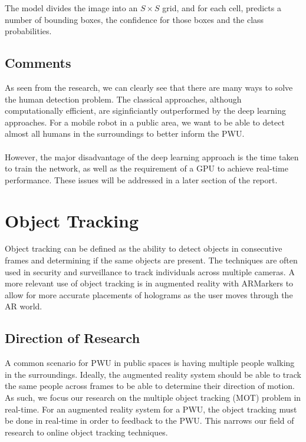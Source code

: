 The model divides the image into an $S \times S$ grid, and for each cell, predicts a number of bounding boxes, the confidence for those boxes and the class probabilities.

\subsection{Comments}
As seen from the research, we can clearly see that there are many ways to solve the human detection problem. The classical approaches, although computationally efficient, are siginficiantly outperformed by the deep learning approaches. For a mobile robot in a public area, we want to be able to detect almost all humans in the surroundings to better inform the PWU.

\paragraph{}However, the major disadvantage of the deep learning approach is the time taken to train the network, as well as the requirement of a GPU to achieve real-time performance. These issues will be addressed in a later section of the report.

\section{Object Tracking}
Object tracking can be defined as the ability to detect objects in consecutive frames and determining if the same objects are present. The techniques are often used in security and surveillance to track individuals across multiple cameras. A more relevant use of object tracking is in augmented reality with ARMarkers to allow for more accurate placements of holograms as the user moves through the AR world.

\subsection{Direction of Research}
 A common scenario for PWU in public spaces is having multiple people walking in the surroundings. Ideally, the augmented reality system should be able to track the same people across frames to be able to determine their direction of motion. As such, we focus our research on the multiple object tracking (MOT) problem in real-time. For an augmented reality system for a PWU, the object tracking must be done in real-time in order to feedback to the PWU. This narrows our field of research to online object tracking techniques.
 

